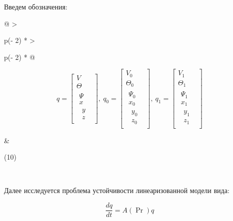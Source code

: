 Введем обозначения:
\begin{longtable}[]{@{}
  >{\raggedright\arraybackslash}p{(\columnwidth - 2\tabcolsep) * }
  >{\raggedright\arraybackslash}p{(\columnwidth - 2\tabcolsep) * }@{}}
\begin{minipage}[b]{\linewidth}\raggedright
\[q = \begin{bmatrix}
V \\
\Theta \\
\begin{matrix}
\Psi \\
x \\
\begin{matrix}
y \\
z
\end{matrix}
\end{matrix}
\end{bmatrix},\ q_{0} = \begin{bmatrix}
V_{0} \\
\Theta_{0} \\
\begin{matrix}
\Psi_{0} \\
x_{0} \\
\begin{matrix}
y_{0} \\
z_{0}
\end{matrix}
\end{matrix}
\end{bmatrix},\ q_{1} = \begin{bmatrix}
V_{1} \\
\Theta_{1} \\
\begin{matrix}
\Psi_{1} \\
x_{1} \\
\begin{matrix}
y_{1} \\
z_{1}
\end{matrix}
\end{matrix}
\end{bmatrix}\]
\end{minipage} & \begin{minipage}[b]{\linewidth}\raggedright
(10)
\end{minipage} \\
\end{longtable}


Далее исследуется проблема устойчивости линеаризованной модели вида:


\begin{equation}
  \frac{{dq}}{{dt}} = {A}({\Pr}){q}
  \tag{11}
\end{equation}





